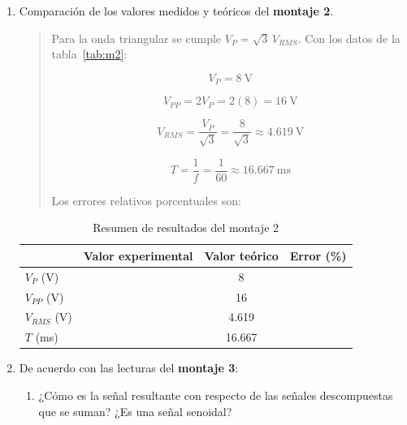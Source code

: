 \documentclass{article}
\newcommand{\vacio}[1][2cm]{\underline{\hspace{#1}}}
\begin{document}
\begin{enumerate}
        \item Comparación de los valores medidos y teóricos del \textbf{montaje 2}.

        \begin{quote}
            Para la onda triangular se cumple $V_P = \sqrt{3}\,V_{RMS}$. Con los datos de la tabla~\ref{tab:m2}:

            \[
                V_P = \SI{8}{\volt}
            \]

            \[
                V_{PP} = 2V_P = 2(8) = \SI{16}{\volt}
            \]

            \[
                V_{RMS} = \frac{V_P}{\sqrt{3}} = \frac{8}{\sqrt{3}} \approx \SI{4.619}{\volt}
            \]

            \[
                T = \frac{1}{f} = \frac{1}{60} \approx \SI{16.667}{\milli\second}
            \]

            Los errores relativos porcentuales son:
        \end{quote}

        \begin{table}[ht!]
            \centering
            \begin{tabular}{lccc}
                \toprule
                                & Valor experimental & Valor teórico & Error (\%)    \\
                \midrule
                $V_P$ (V)       & \vacio[1.8cm]      & 8             & \vacio[1.5cm] \\
                $V_{PP}$ (V)    & \vacio[1.8cm]      & 16            & \vacio[1.5cm] \\
                $V_{RMS}$ (V)   & \vacio[1.8cm]      & 4.619         & \vacio[1.5cm] \\
                $T$ (ms)        & \vacio[1.8cm]      & 16.667        & \vacio[1.5cm] \\
                \bottomrule
            \end{tabular}
            \caption{Resumen de resultados del montaje 2}\label{tab:res-m2}
        \end{table}

        \item De acuerdo con las lecturas del \textbf{montaje 3}:

        \begin{enumerate}[label=\alph*)] %
            \item ¿Cómo es la señal resultante con respecto de las señales descompuestas que se suman? ¿Es una señal senoidal?


\end{enumerate}
\end{enumerate}
\end{document}
